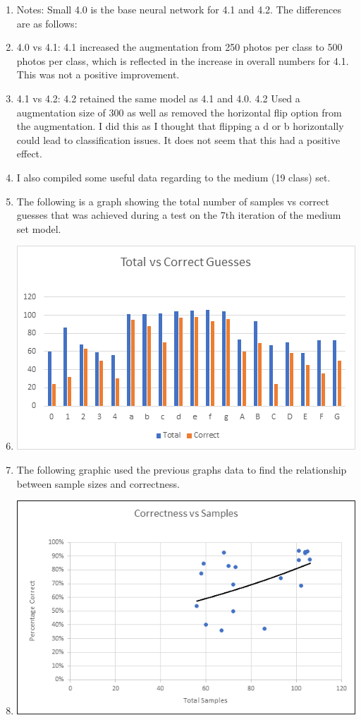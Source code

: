 \documentclass[12pt]{article} %
\begin{document}
\begin{enumerate}[label = (\roman*)]
\item Notes: Small 4.0 is the base neural network for 4.1 and 4.2. The differences are as follows: 
\item 4.0 vs 4.1: 4.1 increased the augmentation from 250 photos per class to 500 photos per class, which is reflected in the increase in overall numbers for 4.1. This was not a positive improvement.
\item 4.1 vs 4.2: 4.2 retained the same model as 4.1 and 4.0. 4.2 Used a augmentation size of 300 as well as removed the horizontal flip option from the augmentation. I did this as I thought that flipping a d or b horizontally could lead to classification issues. It does not seem that this had a positive effect. 
\item I also compiled some useful data regarding to the medium (19 class) set.
\item The following is a graph showing the total number of samples vs correct guesses that was achieved during a test on the 7th iteration of the medium set model.
\item \includegraphics{charts/total-vs-correct}
\item The following graphic used the previous graphs data to find the relationship between sample sizes and correctness.
\item \includegraphics {charts/correct-vs-samples}

\end{enumerate}
\end{document}
